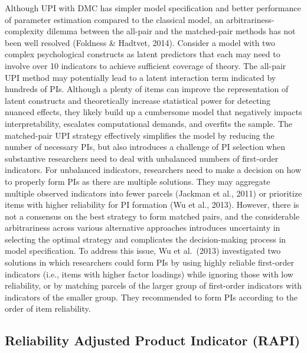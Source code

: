 \documentclass[
  man]{apa6}
\begin{document}
Although UPI with DMC has simpler model specification and better performance of parameter estimation compared to the classical model, an arbitrariness-complexity dilemma between the all-pair and the matched-pair methods has not been well resolved (Foldness \& Hadtvet, 2014). Consider a model with two complex psychological constructs as latent predictors that each may need to involve over 10 indicators to achieve sufficient coverage of theory. The all-pair UPI method may potentially lead to a latent interaction term indicated by hundreds of PIs. Although a plenty of items can improve the representation of latent constructs and theoretically increase statistical power for detecting nuanced effects, they likely build up a cumbersome model that negatively impacts interpretability, escalates computational demands, and overfits the sample. The matched-pair UPI strategy effectively simplifies the model by reducing the number of necessary PIs, but also introduces a challenge of PI selection when substantive researchers need to deal with unbalanced numbers of first-order indicators. For unbalanced indicators, researchers need to make a decision on how to properly form PIs as there are multiple solutions. They may aggregate multiple observed indicators into fewer parcels (Jackman et al., 2011) or prioritize items with higher reliability for PI formation (Wu et al., 2013). However, there is not a consensus on the best strategy to form matched pairs, and the considerable arbitrariness across various alternative approaches introduces uncertainty in selecting the optimal strategy and complicates the decision-making process in model specification. To address this issue, Wu et al.~(2013) investigated two solutions in which researchers could form PIs by using highly reliable first-order indicators (i.e., items with higher factor loadings) while ignoring those with low reliability, or by matching parcels of the larger group of first-order indicators with indicators of the smaller group. They recommended to form PIs according to the order of item reliability.

\hypertarget{reliability-adjusted-product-indicator-rapi}{%
\subsection{Reliability Adjusted Product Indicator (RAPI)}\label{reliability-adjusted-product-indicator-rapi}}
\end{document}

